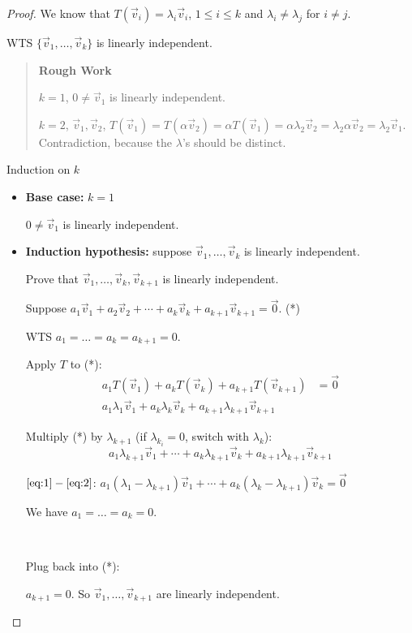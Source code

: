 \documentclass[11pt,fleqn]{book} %
\begin{document}
\begin{proof}
    We know that $T(\vec{v}_i) = \lambda_i\vec{v}_i$, $1 \le i \le k$ and $\lambda_i \neq \lambda_j$ for $i \neq j$. 

    WTS $\{ \vec{v}_1, \dots, \vec{v}_k \}$ is linearly independent. 

\begin{quote}
    \textbf{Rough Work}
    
    $k = 1$, $0 \neq \vec{v}_1$ is linearly independent.
    
    $k = 2$, $\vec{v}_1, \vec{v}_2$, $T(\vec{v}_1) = T(\alpha\vec{v}_2) = \alpha T(\vec{v}_1) = \alpha\lambda_2 \vec{v}_2 = \lambda_2\alpha\vec{v}_2 = \lambda_2\vec{v}_1$. Contradiction, because the $\lambda$'s should be distinct. 
\end{quote}

    Induction on $k$
    
    \begin{itemize}
        \item \textbf{Base case:} $k = 1$

        $0 \neq \vec{v}_1$ is linearly independent.
        
        \item \textbf{Induction hypothesis:} suppose $\vec{v}_1, \dots, \vec{v}_k$ is linearly independent. 
    
        Prove that $\vec{v}_1, \dots, \vec{v}_k, \vec{v}_{k+1}$ is linearly independent. 

    Suppose $a_1\vec{v}_1 + a_2\vec{v}_2 + \cdots + a_k\vec{v}_k + a_{k+1}\vec{v}_{k+1} = \vec{0}$. (*)

    WTS $a_1 = \dots = a_k = a_{k+1} = 0$. 

    Apply $T$ to (*): 
    \begin{align*}
        a_1T(\vec{v}_1) + a_kT(\vec{v}_k) +a_{k+1}T(\vec{v}_{k+1}) 
        &= \vec{0}
        \\
        a_1\lambda_1\vec{v}_1 +a_k\lambda_k\vec{v}_k +a_{k+1}\lambda_{k+1}\vec{v}_{k+1} 
        \label{eq:1}\tag{1}
    \end{align*}

    Multiply (*) by $\lambda_{k+1}$ (if $\lambda_{k_i} = 0$, switch with $\lambda_k$): 
    \begin{equation*}
        a_1\lambda_{k+1}\vec{v}_1 + \cdots + a_k\lambda_{k+1}\vec{v}_k + a_{k+1}\lambda_{k+1}\vec{v}_{k+1}
        \label{eq:2}\tag{2}
    \end{equation*}

    $\ref{eq:1} - \ref{eq:2}$: 
    $a_1(\lambda_1 - \lambda_{k+1})\vec{v}_1 + \cdots + a_k(\lambda_k-\lambda_{k+1})\vec{v}_k = \vec{0}$

    We have $a_1 = \dots = a_k = 0$. 
    
    {~~~}

    Plug back into (*): 

    $a_{k+1} = 0$. So $\vec{v}_1, \dots, \vec{v}_{k+1}$ are linearly independent. 
    \end{itemize}
\end{proof}
\end{document}
